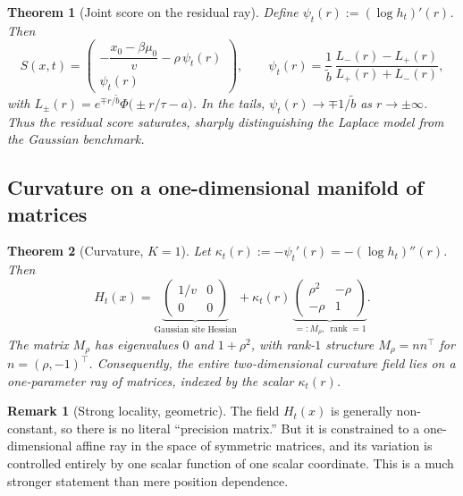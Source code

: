 \documentclass[11pt,a4paper]{article}
\theoremstyle{plainserif}
\newtheorem{theorem}{Theorem}
\theoremstyle{definition}
\theoremstyle{remarkstyle}
\newtheorem*{remark}{Remark}
\newcommand{\btilde}{\tilde{b}}
\begin{document}
\begin{theorem}[Joint score on the residual ray]
\label{thm:score}
Define $\psi_t(r) := (\log h_t)'(r)$. Then
\begin{equation}
S(x,t) = \begin{pmatrix}
-\dfrac{x_0-\beta\mu_0}{v} - \rho\,\psi_t(r) \\[6pt]
\psi_t(r)
\end{pmatrix},
\qquad
\psi_t(r) = \frac{1}{\btilde}\,
\frac{L_-(r)-L_+(r)}{L_+(r)+L_-(r)},
\label{eq:score-ray}
\end{equation}
with $L_\pm(r) = e^{\mp r/\btilde}\Phi\bigl(\pm r/\tau - a\bigr)$.
In the tails,
$\psi_t(r) \to \mp 1/\btilde$ as $r \to \pm\infty$. Thus the residual score
\emph{saturates}, sharply distinguishing the Laplace model from the
Gaussian benchmark.
\end{theorem}

\subsection{Curvature on a one-dimensional manifold of matrices}

\begin{theorem}[Curvature, $K{=}1$]
\label{thm:curv}
Let $\kappa_t(r) := -\psi_t'(r) = -(\log h_t)''(r)$. Then
\begin{equation}
H_t(x) = \underbrace{\begin{pmatrix} 1/v & 0 \\ 0 & 0 \end{pmatrix}}_{\text{Gaussian site Hessian}}
 + \kappa_t(r)\,
   \underbrace{\begin{pmatrix} \rho^2 & -\rho \\ -\rho & 1 \end{pmatrix}}_{=:M_\rho,\ \operatorname{rank}=1}.
\label{eq:H-ray}
\end{equation}
The matrix $M_\rho$ has eigenvalues $0$ and $1+\rho^2$, with rank-$1$
structure $M_\rho = n n^\top$ for $n = (\rho,-1)^\top$. Consequently,
the entire two-dimensional curvature field lies on a one-parameter ray
of matrices, indexed by the scalar $\kappa_t(r)$.
\end{theorem}

\begin{remark}[Strong locality, geometric]
The field $H_t(x)$ is generally non-constant, so there is no literal
``precision matrix.'' But it is constrained to a one-dimensional affine
ray in the space of symmetric matrices, and its variation is controlled
entirely by one scalar function of one scalar coordinate. This is a much
stronger statement than mere position dependence.
\end{remark}
\end{document}
